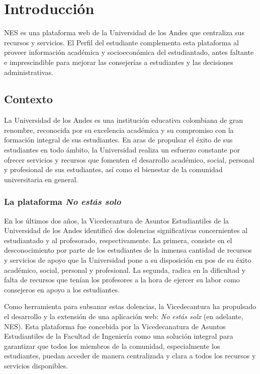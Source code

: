 \chapter{Introducción}

\begin{resumen}
	NES es una plataforma web de la Universidad de los Andes que centraliza sus recursos y servicios. El Perfil del estudiante complementa esta plataforma al proveer información académica y socioeconómica del estudiantado, antes faltante e imprescindible para mejorar las consejerías a estudiantes y las decisiones administrativas.
\end{resumen}

\section{Contexto}

La Universidad de los Andes es una institución educativa colombiana de gran renombre, reconocida por su excelencia académica y su compromiso con la formación integral de sus estudiantes. En aras de propulsar el éxito de sus estudiantes en todo ámbito, la Universidad realiza un esfuerzo constante por ofrecer servicios y recursos que fomenten el desarrollo académico, social, personal y profesional de sus estudiantes, así como el bienestar de la comunidad universitaria en general.

\subsection{La plataforma \textit{No estás solo}}

En los últimos dos años, la Vicedecantura de Asuntos Estudiantiles de la Universidad de los Andes identificó dos dolencias significativas concernientes al estudiantado y al profesorado, respectivamente. La primera, consiste en el desconocimiento por parte de los estudiantes de la inmensa cantidad de recursos y servicios de apoyo que la Universidad pone a su disposición en pos de su éxito académico, social, personal y profesional. La segunda, radica en la dificultad y falta de recursos que tenían los profesores a la hora de ejercer su labor como consejeros en apoyo a los estudiantes.

Como herramienta para subsanar estas dolencias, la Vicedecantura ha propulsado el desarrollo y la extensión de una aplicación web: \textit{No estás solx} (en adelante, NES). Esta plataforma fue concebida por la Vicedecanatura de Asuntos Estudiantiles de la Facultad de Ingeniería como una solución integral para garantizar que todos los miembros de la comunidad, especialmente los estudiantes, puedan acceder de manera centralizada y clara a todos los recursos y servicios disponibles.

